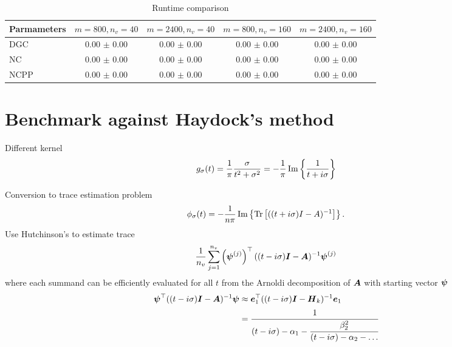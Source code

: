 \begin{table}[ht]
    \caption{Runtime comparison}
    \label{tab:5-experiments-electronic-structure-runtime}
    \centering
    \renewcommand{\arraystretch}{1.2}
    \begin{tabular}{@{}lcccc@{}}
        \toprule
        Parmameters & $m=800,n_v=40$ & $m=2400,n_v=40$ & $m=800,n_v=160$ & $m=2400,n_v=160$ \\
        \midrule
        \gls{DGC} & 0.00 $\pm$ 0.00 & 0.00 $\pm$ 0.00 & 0.00 $\pm$ 0.00 & 0.00 $\pm$ 0.00 \\
        \gls{NC} & 0.00 $\pm$ 0.00 & 0.00 $\pm$ 0.00 & 0.00 $\pm$ 0.00 & 0.00 $\pm$ 0.00 \\
        \gls{NCPP} & 0.00 $\pm$ 0.00 & 0.00 $\pm$ 0.00 & 0.00 $\pm$ 0.00 & 0.00 $\pm$ 0.00 \\
        \bottomrule
    \end{tabular}
\end{table}

\section{Benchmark against Haydock's method}
\label{sec:5-experiments-haydock-method}

Different kernel
\begin{equation}
    g_{\sigma}(t) = \frac{1}{\pi} \frac{\sigma}{t^2 + \sigma^2} = -\frac{1}{\pi} \operatorname{Im}\left\{ \frac{1}{t + i\sigma} \right\}
    \label{equ:5-experiments-cauchy-kernel}
\end{equation}

Conversion to trace estimation problem
\begin{equation}
    \phi_{\sigma}(t) = - \frac{1}{n \pi} \operatorname{Im} \left\{ \operatorname{Tr}\left[((t + i\sigma)I - A)^{-1}\right]  \right\}.
    \label{equ:5-experiments-haydock-trace}
\end{equation}
Use Hutchinson's to estimate trace
\begin{equation}
    \frac{1}{n_v} \sum_{j=1}^{n_v} \left( \boldsymbol{\psi}^{(j)} \right)^{\top} ((t - i\sigma)\boldsymbol{I} - \boldsymbol{A})^{-1} \boldsymbol{\psi}^{(j)}
    \label{equ:5-experiments-haydock-hutchinson}
\end{equation}
where each summand can be efficiently evaluated for all $t$ from the Arnoldi decomposition of $\boldsymbol{A}$ with starting vector $\boldsymbol{\psi}$
\begin{align}
    \boldsymbol{\psi}^{\top} ((t - i\sigma)\boldsymbol{I} - \boldsymbol{A})^{-1} \boldsymbol{\psi} &\approx \boldsymbol{e}_1^{\top} ((t - i\sigma)\boldsymbol{I} - \boldsymbol{H}_k)^{-1} \boldsymbol{e}_1 \notag \\
    &= \cfrac{1}{(t - i\sigma) - \alpha_1 - \cfrac{\beta_2^2}{(t - i\sigma) - \alpha_2 - \dots}}
    \label{equ:5-experiments-haydock-recursion}
\end{align}

